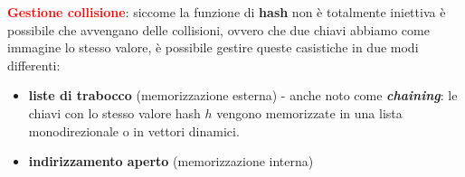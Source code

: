 \begin{flushleft}
    \textcolor{red}{\textbf{Gestione collisione}}: siccome la funzione di \textbf{hash} non è totalmente iniettiva è possibile che avvengano delle collisioni, ovvero che due chiavi abbiamo come immagine lo stesso valore, è possibile gestire queste casistiche in due modi differenti:
    \begin{itemize}[nosep]
        \item \textbf{liste di trabocco} (memorizzazione esterna) - anche noto come \textbf{\textit{chaining}}: le chiavi con lo stesso valore hash $h$ vengono memorizzate in una lista monodirezionale o in vettori dinamici.
        \item \textbf{indirizzamento aperto} (memorizzazione interna)
    \end{itemize}
\end{flushleft}

